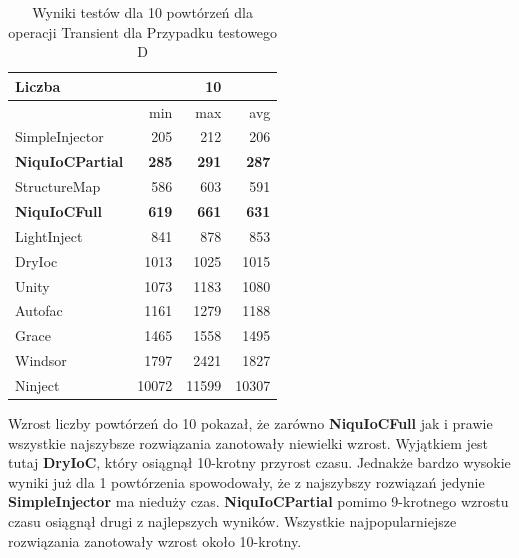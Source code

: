 \documentclass[12pt]{article}
\begin{document}
\begin{table}[H]
\captionsetup{belowskip=0pt,aboveskip=0pt}
\begin{center}
\begin{small}
	\begin{tabular}{ | l | r r r | }
    		\hline
Liczba & & 10 & \\ \hline
 & min & max & avg \\ \hline
SimpleInjector & 205 & 212 & 206 \\ \hline
\textbf{NiquIoCPartial} & \textbf{285} & \textbf{291} & \textbf{287} \\ \hline
StructureMap & 586 & 603 & 591 \\ \hline
\textbf{NiquIoCFull} & \textbf{619} & \textbf{661} & \textbf{631} \\ \hline
LightInject & 841 & 878 & 853 \\ \hline
DryIoc & 1013 & 1025 & 1015 \\ \hline
Unity & 1073 & 1183 & 1080 \\ \hline
Autofac & 1161 & 1279 & 1188 \\ \hline
Grace & 1465 & 1558 & 1495 \\ \hline
Windsor & 1797 & 2421 & 1827 \\ \hline
Ninject & 10072 & 11599 & 10307 \\ \hline
  	\end{tabular}
\end{small}
\end{center}
\caption{Wyniki testów dla 10 powtórzeń dla operacji Transient dla Przypadku testowego D}
\label{TestCaseD_Transient10}
\end{table}
Wzrost liczby powtórzeń do 10 pokazał, że zarówno \textbf{NiquIoCFull} jak i prawie wszystkie najszybsze rozwiązania zanotowały niewielki wzrost. Wyjątkiem jest tutaj \textbf{DryIoC}, który osiągnął 10-krotny przyrost czasu. Jednakże bardzo wysokie wyniki już dla 1 powtórzenia spowodowały, że z najszybszy rozwiązań jedynie \textbf{SimpleInjector} ma nieduży czas. \textbf{NiquIoCPartial} pomimo 9-krotnego wzrostu czasu osiągnął drugi z najlepszych wyników. Wszystkie najpopularniejsze rozwiązania zanotowały wzrost około 10-krotny.
\end{document}
